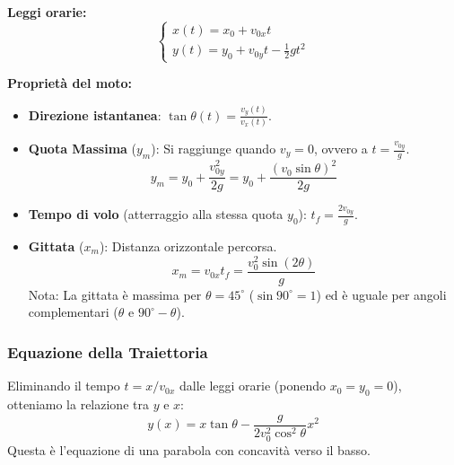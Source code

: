 \textbf{Leggi orarie:}
\begin{equation}
    \begin{cases}
    x(t) = x_0 + v_{0x} t \\
    y(t) = y_0 + v_{0y} t - \frac{1}{2} g t^2
\end{cases}
\end{equation}

\textbf{Proprietà del moto:}
\begin{itemize}
    \item \textbf{Direzione istantanea}: $\tan \theta(t) = \frac{v_y(t)}{v_x(t)}$.
    \item \textbf{Quota Massima} ($y_m$): Si raggiunge quando $v_y = 0$, ovvero a $t = \frac{v_{0y}}{g}$.
    \begin{equation}
    y_m = y_0 + \frac{v_{0y}^2}{2g} = y_0 + \frac{(v_0 \sin\theta)^2}{2g}
\end{equation}
    \item \textbf{Tempo di volo} (atterraggio alla stessa quota $y_0$): $t_f = \frac{2v_{0y}}{g}$.
    \item \textbf{Gittata} ($x_m$): Distanza orizzontale percorsa.
    \begin{equation}
    x_m = v_{0x} t_f = \frac{v_0^2 \sin(2\theta)}{g}
\end{equation}
    Nota: La gittata è massima per $\theta = 45^\circ$ ($\sin 90^\circ = 1$) ed è uguale per angoli complementari ($\theta$ e $90^\circ - \theta$).
\end{itemize}

\begin{center}
\end{center}

\subsubsection{Equazione della Traiettoria}
Eliminando il tempo $t = x/v_{0x}$ dalle leggi orarie (ponendo $x_0=y_0=0$), otteniamo la relazione tra $y$ e $x$:
\begin{equation}
    y(x) = x \tan\theta - \frac{g}{2v_0^2 \cos^2\theta} x^2
\end{equation}
Questa è l'equazione di una parabola con concavità verso il basso.

